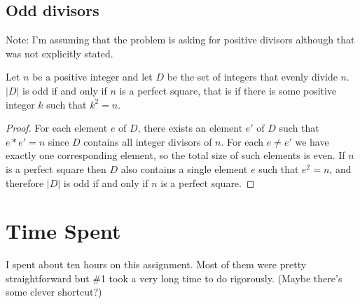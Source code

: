 \documentclass[12pt]{article}
\begin{document}
\subsection*{Odd divisors}

Note: I'm assuming that the problem is asking for positive divisors although that was not explicitly stated.


Let $n$ be a positive integer and let $D$ be the set of integers that evenly divide $n$. $|D|$ is odd if and only if $n$ is a perfect square, that is if there is some positive integer $k$ such that $k^2 = n$.
\begin{proof}
For each element $e$ of $D$, there exists an element $e'$ of $D$ such that $e*e' = n$ since $D$ contains all integer divisors of $n$. For each $e \neq e'$ we have exactly one corresponding element, so the total size of such elements is even. If $n$ is a perfect square then $D$ also contains a single element $e$ such that $e^2=n$, and therefore $|D|$ is odd if and only if $n$ is a perfect square.
\end{proof}
\section{Time Spent}

I spent about ten hours on this assignment. Most of them were pretty straightforward but \#1 took a very long time to do rigorously. (Maybe there's some clever shortcut?)
\end{document}
